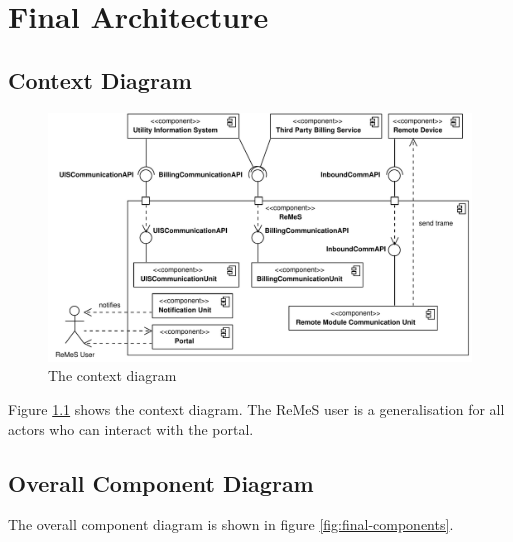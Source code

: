 \chapter{Final Architecture}
\label{chap:final-architecture}

\section{Context Diagram}

\begin{figure}[H]
	\begin{centering}
		\includegraphics[width=\textwidth]{figs/final-context.pdf}
		\caption{The context diagram}
		\label{fig:final-context}
	\end{centering}
\end{figure}

\npar Figure \ref{fig:final-context} shows the context diagram. The ReMeS
user is a generalisation for all actors who can interact with the portal. 

\section{Overall Component Diagram}

\npar The overall component diagram is shown in figure \ref{fig:final-components}.

